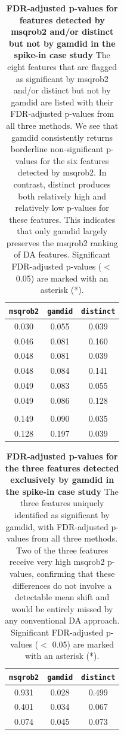 \renewcommand{\thetable}{S\arabic{table}}
\renewcommand{\tablename}{Supplemental Table}
\setcounter{table}{0}

\begin{table}[htbp]
\centering
\begin{tabular}{ccc}
\hline
\texttt{msqrob2} & \texttt{gamdid} & \texttt{distinct} \\
\hline
0.030\rlap{$^{*}$} & 0.055 & 0.039\rlap{$^{*}$}\\
0.046\rlap{$^{*}$} & 0.081 & 0.160\\
0.048\rlap{$^{*}$} & 0.081 & 0.039\rlap{$^{*}$}\\
0.048\rlap{$^{*}$} & 0.084 & 0.141\\
0.049\rlap{$^{*}$} & 0.083 & 0.055\\
0.049\rlap{$^{*}$} & 0.086 & 0.128\\
\\
0.149 & 0.090 & 0.035\rlap{$^{*}$}\\
0.128 & 0.197 & 0.039\rlap{$^{*}$}\\
\hline
\end{tabular}
\caption{\textbf{FDR-adjusted p-values for features detected by msqrob2 and/or distinct but not by gamdid in the spike-in case study} The eight features that are flagged as significant by msqrob2 and/or distinct but not by gamdid are listed with their FDR-adjusted p-values from all three methods. We see that gamdid consistently returns borderline non-significant p-values for the six features detected by msqrob2. In contrast, distinct produces both relatively high and relatively low p-values for these features. This indicates that only gamdid largely preserves the msqrob2 ranking of DA features. Significant FDR-adjusted p-values ($<$ 0.05) are marked with an asterisk (*).}
\label{tab:only_msqrob2}
\end{table}

\begin{table}[htbp]
\centering
\begin{tabular}{ccc}
\hline
\texttt{msqrob2} & \texttt{gamdid} & \texttt{distinct} \\
\hline
0.931 & 0.028\rlap{$^{*}$} & 0.499\\
0.401 & 0.034\rlap{$^{*}$} & 0.067\\
0.074 & 0.045\rlap{$^{*}$} & 0.073\\
\hline
\end{tabular}
\caption{\textbf{FDR-adjusted p-values for the three features detected exclusively by gamdid in the spike-in case study} The three features uniquely identified as significant by gamdid, with FDR-adjusted p-values from all three methods. Two of the three features receive very high msqrob2 p-values, confirming that these differences do not involve a detectable mean shift and would be entirely missed by any conventional DA approach. Significant FDR-adjusted p-values ($<$ 0.05) are marked with an asterisk (*).}
\label{tab:only_gamdid}
\end{table}

